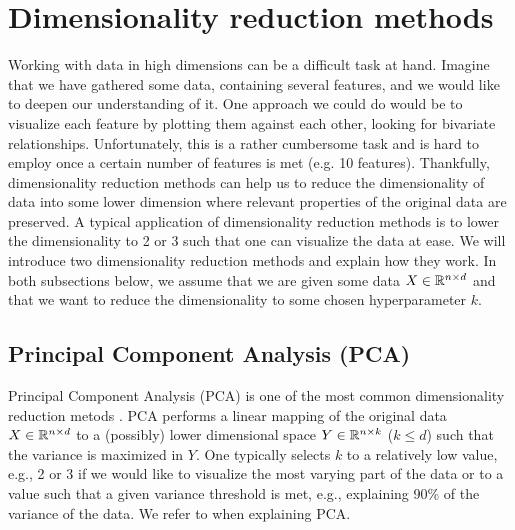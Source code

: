 \section{Dimensionality reduction methods}
Working with data in high dimensions can be a difficult task at hand. Imagine that we have gathered some data, containing several features, and we would like to deepen our understanding of it. One approach we could do would be to visualize each feature by plotting them against each other, looking for bivariate relationships. Unfortunately, this is a rather cumbersome task and is hard to employ once a certain number of features is met (e.g. 10 features). Thankfully, dimensionality reduction methods can help us to reduce the dimensionality of data into some lower dimension where relevant properties of the original data are preserved. A typical application of dimensionality reduction methods is to lower the dimensionality to 2 or 3 such that one can visualize the data at ease. We will introduce two dimensionality reduction methods and explain how they work. In both subsections below, we assume that we are given some data $X \in \mathbb{R}^{n \times d}$ and that we want to reduce the dimensionality to some chosen hyperparameter $k$.

\subsection{Principal Component Analysis (PCA)}
\label{sec:pca}
Principal Component Analysis (PCA) is one of the most common dimensionality reduction metods \cite{Jolliffe2002}. PCA performs a linear mapping of the original data $X \in \mathbb{R}^{n \times d}$ to a (possibly) lower dimensional space $Y \in \mathbb{R}^{n \times k}$ ($k \leq d$) such that the variance is maximized in $Y$. One typically selects $k$ to a relatively low value, e.g., 2 or 3 if we would like to visualize the most varying part of the data or to a value such that a given variance threshold is met, e.g., explaining 90\% of the variance of the data. We refer to \cite{Jolliffe2002} when explaining PCA.

